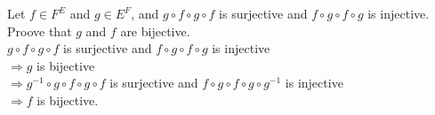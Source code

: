 \documentclass{article}
\begin{document}
\noindent Let $f \in F^E$ and $g \in E^F$, and $ g \circ f \circ g \circ f$
is surjective and $f \circ g \circ f \circ g$ is injective.
Proove that $g$ and $f$ are bijective.\\

\noindent $ g \circ f \circ g \circ f$ is surjective
and $ f \circ g \circ f \circ g$ is injective\\
$\Rightarrow g$ is bijective\\
$\Rightarrow g^{-1} \circ g \circ f \circ g \circ f$
is surjective and $ f \circ g \circ f \circ g \circ
g^{-1}$ is injective \\
$\Rightarrow f$ is bijective.
\end{document}
